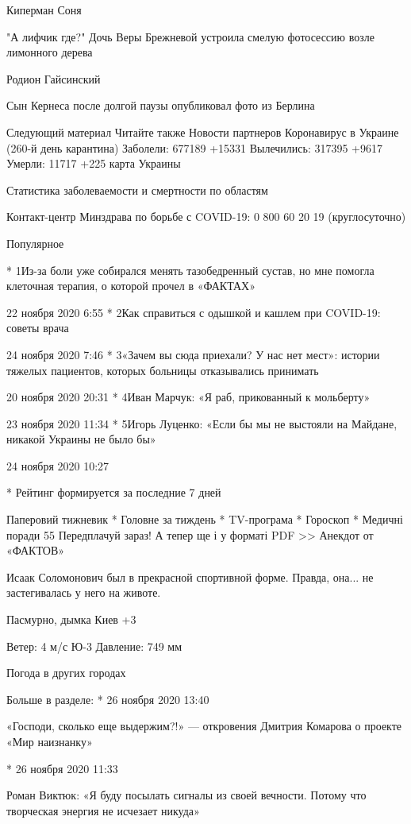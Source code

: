 Киперман Соня

"А лифчик где?" Дочь Веры Брежневой устроила смелую фотосессию возле
лимонного дерева

Родион Гайсинский

Сын Кернеса после долгой паузы опубликовал фото из Берлина

Следующий материал
Читайте также
Новости партнеров
Коронавирус в Украине
(260-й день карантина)
Заболели:
677189
+15331
Вылечились:
317395
+9617
Умерли:
11717
+225
карта Украины

Статистика заболеваемости и
смертности по областям

Контакт-центр Минздрава по борьбе с COVID-19:
0 800 60 20 19 (круглосуточно)


Популярное

* 1Из-за боли уже собирался менять тазобедренный сустав, но мне помогла
клеточная терапия, о которой прочел в «ФАКТАХ»

22 ноября 2020 6:55
* 2Как справиться с одышкой и кашлем при COVID-19: советы врача

24 ноября 2020 7:46
* 3«Зачем вы сюда приехали? У нас нет мест»: истории тяжелых пациентов,
которых больницы отказывались принимать

20 ноября 2020 20:31
* 4Иван Марчук: «Я раб, прикованный к мольберту»

23 ноября 2020 11:34
* 5Игорь Луценко: «Если бы мы не выстояли на Майдане, никакой Украины не
было бы»

24 ноября 2020 10:27

* Рейтинг формируется за последние 7 дней

Паперовий
тижневик
* Головне за тиждень
* TV-програма
* Гороскоп
* Медичні поради
55
Передплачуй
зараз!
А тепер ще і у форматі PDF >>
Анекдот от «ФАКТОВ»

Исаак Соломонович был в прекрасной спортивной форме. Правда, она... не
застегивалась у него на животе.

Пасмурно, дымка
Киев
+3

Ветер: 4 м/с  Ю-3
Давление: 749 мм

Погода в других городах

Больше в разделе:
* 26 ноября 2020 13:40

«Господи, сколько еще выдержим?!» — откровения Дмитрия Комарова о проекте
«Мир наизнанку»

* 26 ноября 2020 11:33

Роман Виктюк: «Я буду посылать сигналы из своей вечности. Потому что
творческая энергия не исчезает никуда»

